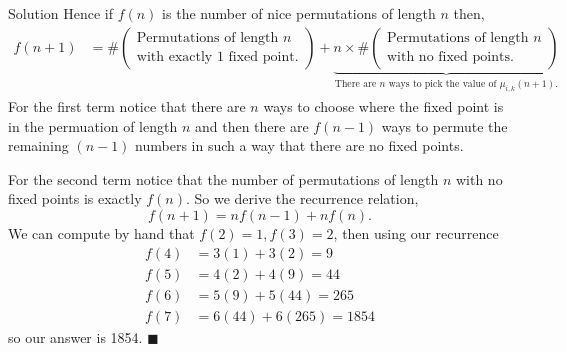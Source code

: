 \documentclass{article}
\begin{document}
\begin{solution}{Solution}
Hence if $f(n)$ is the number of nice permutations of length $n$ then,
\[
\begin{aligned}
f(n+1) &= \# \begin{pmatrix}
\text{Permutations of length } n \\
\text{with exactly 1 fixed point.}
\end{pmatrix}
+
\underbrace{
n \times \# \begin{pmatrix}
\text{Permutations of length } n \\
\text{with no fixed points.}
\end{pmatrix}
}_{\text{There are $n$ ways to pick the value of $\mu_{i,k}(n+1)$.}}
\end{aligned}
\]
For the first term notice that there are $n$ ways to choose where the
fixed point is in the permuation of length $n$ and then there are
$f(n-1)$ ways to permute the remaining $(n-1)$ numbers in such a way
that there are no fixed points. \vspace{0.2cm}

For the second term notice that the number of permutations of length $n$
with no fixed points is exactly $f(n)$. So we derive the recurrence
relation,
$$
f(n+1) = nf(n-1) + nf(n).
$$
We can compute by hand that $f(2) = 1, f(3) = 2$, then using our recurrence
\[
\begin{aligned}
f(4) &= 3(1) + 3(2) = 9 \\
f(5) &= 4(2) + 4(9) = 44 \\
f(6) &= 5(9) + 5(44) = 265 \\
f(7) &= 6(44) + 6(265) = 1854
\end{aligned}
\]
so our answer is 1854. $\blacksquare$
\end{solution}
\newpage
\end{document}
